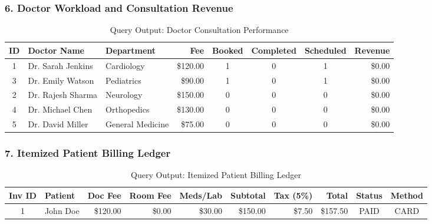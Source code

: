 \documentclass[12pt,a4paper]{article}
\begin{document}
\subsubsection{6. Doctor Workload and Consultation Revenue}
\begin{table}[H]
\centering
\small
\caption{Query Output: Doctor Consultation Performance}
\vspace{0.15cm}
\begin{tabularx}{\textwidth}{|c|l|l|r|c|c|c|r|}
\hline
\textbf{ID} & \textbf{Doctor Name} & \textbf{Department} & \textbf{Fee} & \textbf{Booked} & \textbf{Completed} & \textbf{Scheduled} & \textbf{Revenue} \\
\hline
1 & Dr. Sarah Jenkins & Cardiology       & \$120.00 & 1 & 0 & 1 & \$0.00 \\
\hline
3 & Dr. Emily Watson  & Pediatrics       & \$90.00  & 1 & 0 & 1 & \$0.00 \\
\hline
2 & Dr. Rajesh Sharma & Neurology        & \$150.00 & 0 & 0 & 0 & \$0.00 \\
\hline
4 & Dr. Michael Chen  & Orthopedics      & \$130.00 & 0 & 0 & 0 & \$0.00 \\
\hline
5 & Dr. David Miller  & General Medicine & \$75.00  & 0 & 0 & 0 & \$0.00 \\
\hline
\end{tabularx}
\end{table}

\subsubsection{7. Itemized Patient Billing Ledger}
\begin{table}[H]
\centering
\small
\caption{Query Output: Itemized Patient Billing Ledger}
\vspace{0.15cm}
\begin{tabularx}{\textwidth}{|c|l|r|r|r|r|r|r|c|c|}
\hline
\textbf{Inv ID} & \textbf{Patient} & \textbf{Doc Fee} & \textbf{Room Fee} & \textbf{Meds/Lab} & \textbf{Subtotal} & \textbf{Tax (5\%)} & \textbf{Total} & \textbf{Status} & \textbf{Method} \\
\hline
1 & John Doe & \$120.00 & \$0.00 & \$30.00 & \$150.00 & \$7.50 & \$157.50 & PAID & CARD \\
\hline
\end{tabularx}
\end{table}
\end{document}
